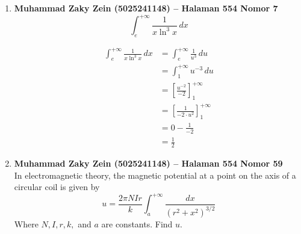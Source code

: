 \documentclass[12pt, letterpaper]{article}
\begin{document}
\begin{enumerate}
    \item \textbf{Muhammad Zaky Zein (5025241148) – Halaman 554 Nomor 7}
    \[
    \int_{e}^{+\infty} \frac{1}{x \ln^3 x} \, dx
    \]
    \begin{center}
    \end{center}

    \begin{center}
    \end{center}
    
    \begin{align*}
    \int_{e}^{+\infty} \frac{1}{x \ln^3 x} \, dx
    &= \int_{e}^{+\infty} \frac{1}{u^3} \, du \\
    &= \int_{1}^{+\infty} u^{-3} \, du \\
    &= \left[ \frac{u^{-2}}{-2} \right]_{1}^{+\infty} \\
    &= \left[ \frac{1}{-2 \cdot u^2} \right]_{1}^{+\infty} \\
    &= 0 - \frac{1}{-2} \\
    &= \frac{1}{2}
    \end{align*}

    \item \textbf{Muhammad Zaky Zein (5025241148) – Halaman 554 Nomor 59} \\
     In electromagnetic theory, the magnetic potential at a point on the axis of a circular coil is given by
    \[
    u = \frac{2 \pi NIr}{k} \int_{a}^{+\infty} \frac{dx}{(r^2 + x^2)^{3/2}}
    \]
    Where $N, I, r, k,$ and $a$ are constants. Find $u$.
    

\end{enumerate}
\end{document}
